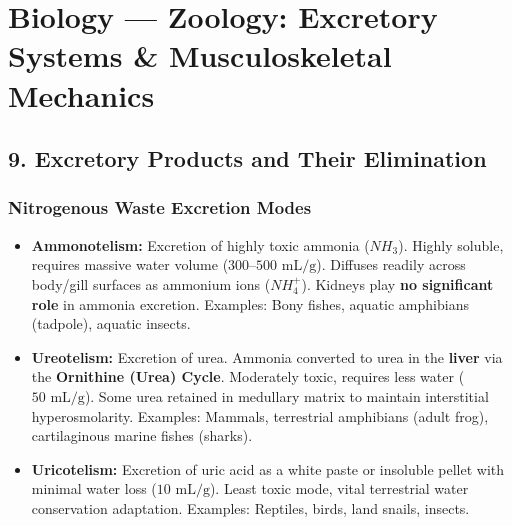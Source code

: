 \documentclass[11pt,a4paper]{article}
\begin{document}
\vspace{10pt}

\section{Biology --- Zoology: Excretory Systems \& Musculoskeletal Mechanics}

\subsection{9. Excretory Products and Their Elimination}

\subsubsection{Nitrogenous Waste Excretion Modes}
\begin{itemize}[leftmargin=1.5em, itemsep=2pt]
  \item \textbf{Ammonotelism:} Excretion of highly toxic ammonia ($NH_3$). Highly soluble, requires massive water volume ($300$--$500\text{ mL/g}$). Diffuses readily across body/gill surfaces as ammonium ions ($NH_4^+$). Kidneys play \textbf{no significant role} in ammonia excretion. Examples: Bony fishes, aquatic amphibians (tadpole), aquatic insects.
  \item \textbf{Ureotelism:} Excretion of urea. Ammonia converted to urea in the \textbf{liver} via the \textbf{Ornithine (Urea) Cycle}. Moderately toxic, requires less water ($50\text{ mL/g}$). Some urea retained in medullary matrix to maintain interstitial hyperosmolarity. Examples: Mammals, terrestrial amphibians (adult frog), cartilaginous marine fishes (sharks).
  \item \textbf{Uricotelism:} Excretion of uric acid as a white paste or insoluble pellet with minimal water loss ($10\text{ mL/g}$). Least toxic mode, vital terrestrial water conservation adaptation. Examples: Reptiles, birds, land snails, insects.
\end{itemize}
\end{document}
